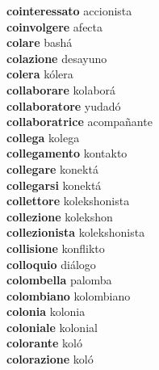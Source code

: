 \textbf{cointeressato } accionista \\
\textbf{coinvolgere } afecta \\
\textbf{colare } bashá \\
\textbf{colazione } desayuno \\
\textbf{colera } kólera \\
\textbf{collaborare } kolaborá \\
\textbf{collaboratore } yudadó \\
\textbf{collaboratrice } acompañante \\
\textbf{collega } kolega \\
\textbf{collegamento } kontakto \\
\textbf{collegare } konektá \\
\textbf{collegarsi } konektá \\
\textbf{collettore } kolekshonista \\
\textbf{collezione } kolekshon \\
\textbf{collezionista } kolekshonista \\
\textbf{collisione } konflikto \\
\textbf{colloquio } diálogo \\
\textbf{colombella } palomba \\
\textbf{colombiano } kolombiano \\
\textbf{colonia } kolonia \\
\textbf{coloniale } kolonial \\
\textbf{colorante } koló \\
\textbf{colorazione } koló \\
